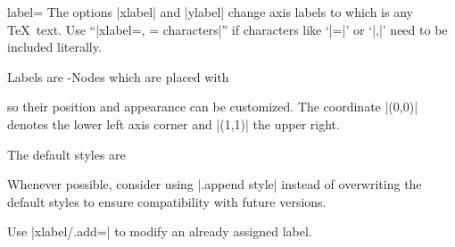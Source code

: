 \begin{pgfplotsxykey}{\x label=}
The options |xlabel| and |ylabel| change axis labels to  which is any \TeX\ text. Use ``|xlabel={, = characters}|'' if characters like `|=|' or `|,|' need to be included literally.

Labels are \Tikz-Nodes which are placed with
\begin{codeexample}
\node 
	[style=every axis label,
	style=every axis x label]
\node 
	[style=every axis label,
	style=every axis y label] 
\end{codeexample}
so their position and appearance can be customized. The coordinate |(0,0)| denotes the lower left axis corner and |(1,1)| the upper right. 

The default styles are
\begin{codeexample}
\end{codeexample}
Whenever possible, consider using |.append style| instead of overwriting the default styles to ensure compatibility with future versions.
\begin{codeexample}
\end{codeexample}
	Use |xlabel/.add=| to modify an already assigned label.
\end{pgfplotsxykey}

